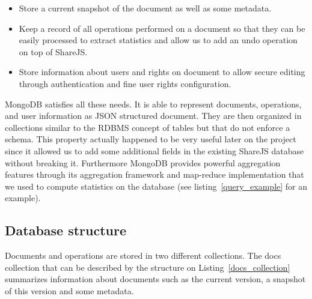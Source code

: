 \documentclass{llncs}
\begin{document}
\begin{itemize}
        \item Store a current snapshot of the document as well as some metadata.
        \item Keep a record of all operations performed on a document so that
            they can be easily processed to extract statistics and allow us to
            add an undo operation on top of ShareJS.
        \item Store information about users and rights on document to allow
            secure editing through authentication and fine user rights
            configuration.
\end{itemize}

MongoDB satisfies all these needs. It is able to represent documents, operations,
and user information as JSON structured document. They are then organized in
collections similar to the RDBMS concept of tables but that do not enforce a schema.
This property actually happened to be very useful later on the project since it
allowed us to add some additional fields in the existing ShareJS database without
breaking it. Furthermore MongoDB provides powerful aggregation features through
its aggregation framework and map-reduce implementation that we used to compute
statistics on the database (see listing~\ref{query_example} for an example).

\subsection{Database structure}

Documents and operations are stored in two different collections. The docs
collection that can be described by the structure on
Listing~\ref{docs_collection} summarizes information about documents such
as the current version, a snapshot of this version and some metadata.
\end{document}
